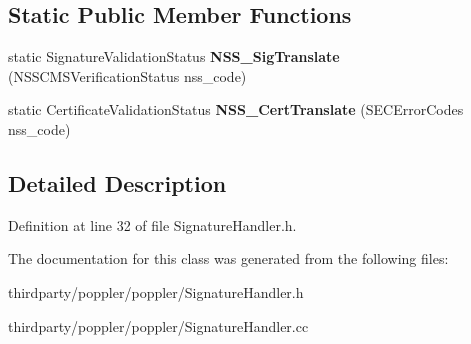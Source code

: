\subsection*{Static Public Member Functions}
\begin{DoxyCompactItemize}
\item 
\mbox{\label{class_signature_handler_aa84665fae6632e802dde113957f65515}} 
static Signature\+Validation\+Status {\bfseries N\+S\+S\+\_\+\+Sig\+Translate} (N\+S\+S\+C\+M\+S\+Verification\+Status nss\+\_\+code)
\item 
\mbox{\label{class_signature_handler_a5afdd91bd194822286852a5a293bebe5}} 
static Certificate\+Validation\+Status {\bfseries N\+S\+S\+\_\+\+Cert\+Translate} (S\+E\+C\+Error\+Codes nss\+\_\+code)
\end{DoxyCompactItemize}


\subsection{Detailed Description}


Definition at line 32 of file Signature\+Handler.\+h.



The documentation for this class was generated from the following files\+:\begin{DoxyCompactItemize}
\item 
thirdparty/poppler/poppler/Signature\+Handler.\+h\item 
thirdparty/poppler/poppler/Signature\+Handler.\+cc\end{DoxyCompactItemize}
